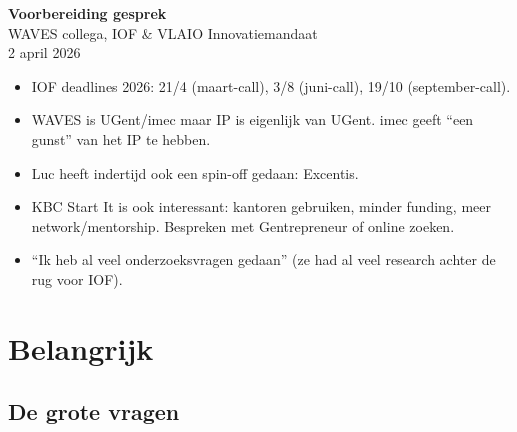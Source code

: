 \documentclass[11pt,a4paper]{article}
\begin{document}
\begin{center}
{\LARGE\bfseries Voorbereiding gesprek}\\[0.3em]
{\large WAVES collega, IOF \& VLAIO Innovatiemandaat}\\[0.3em]
{\small 2 april 2026}
\end{center}

\vspace{0.5em}

\begin{tcolorbox}[colback=white, colframe=accent, boxrule=1pt, arc=3pt, title={\textbf{Algemene notities}}, fonttitle=\bfseries\color{white}, colbacktitle=accent]
\begin{itemize}[leftmargin=*, itemsep=0.3em]
\item IOF deadlines 2026: 21/4 (maart-call), 3/8 (juni-call), 19/10 (september-call).
\item WAVES is UGent/imec maar IP is eigenlijk van UGent. imec geeft ``een gunst'' van het IP te hebben.
\item Luc heeft indertijd ook een spin-off gedaan: Excentis.
\item KBC Start It is ook interessant: kantoren gebruiken, minder funding, meer network/mentorship. Bespreken met Gentrepreneur of online zoeken.
\item ``Ik heb al veel onderzoeksvragen gedaan'' (ze had al veel research achter de rug voor IOF).
\end{itemize}
\end{tcolorbox}

\section{Belangrijk}

\subsection{De grote vragen}
\end{document}

